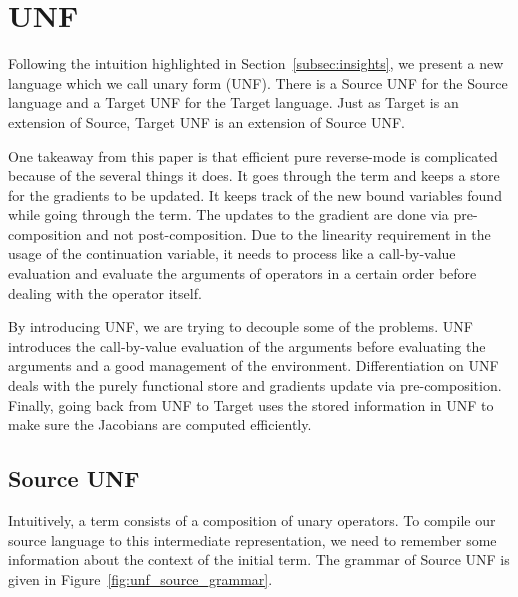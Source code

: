 \section{UNF}
\label{sec:unf}

Following the intuition highlighted in Section~\ref{subsec:insights}, 
we present a new language which we call unary form (UNF). 
There is a Source UNF for the Source language and a Target UNF for the Target language.
Just as Target is an extension of Source, Target UNF is an extension of Source UNF.

One takeaway from this paper is that efficient pure reverse-mode is complicated because of the several things it does.
It goes through the term and keeps a store for the gradients to be updated. 
It keeps track of the new bound variables found while going through the term.
The updates to the gradient are done via pre-composition and not post-composition.
Due to the linearity requirement in the usage of the continuation variable, 
it needs to process like a call-by-value evaluation and evaluate the arguments of operators in a certain order before 
dealing with the operator itself.

By introducing UNF, we are trying to decouple some of the problems.
UNF introduces the call-by-value evaluation of the arguments before evaluating the arguments and a good management of the environment.
Differentiation on UNF deals with the purely functional store and gradients update via pre-composition.
Finally, going back from UNF to Target uses the stored information in UNF to make sure the Jacobians are computed efficiently. 

\subsection{Source UNF} %
\label{sub:Source UNF}

Intuitively, a term consists of a composition of unary operators. 
To compile our source language to this intermediate representation, 
we need to remember some information about the context of the initial term. 
The grammar of Source UNF is given in Figure~\ref{fig:unf_source_grammar}. 



